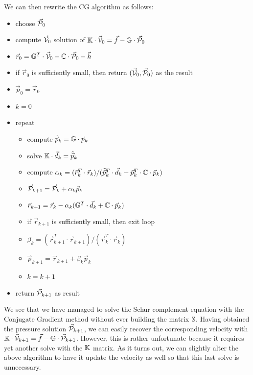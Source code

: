 We can then rewrite the CG algorithm as follows: 
\begin{itemize}
\item choose $\vec{\cal P}_0$
\item compute $\vec{\cal V}_0$ solution of ${\mathbb{K}}\cdot \vec{\cal V}_0 =\vec{f}- {\mathbb{G}}\cdot \vec{\cal P}_0$ 
\item $\vec{r}_0 = {\mathbb{G}}^T\cdot \vec{\cal V}_0 - {\mathbb{C}} \cdot \vec{\cal P}_0 - \vec{h}$ 
\item if $\vec{r}_0$ is sufficiently small, then return $(\vec{\cal V}_0,\vec{\cal P}_0)$ as the result
\item $\vec{p}_0=\vec{r}_0$
\item $k=0$
\item repeat
\begin{itemize}
\item compute $\tilde{\vec{p}}_k = {\mathbb{G}}\cdot \vec{p}_k$
\item solve ${\mathbb{K}}\cdot  \vec{d}_k = \tilde{\vec{p}}_k$
\item compute $\alpha_k=(\vec{r}_k^T \cdot  \vec{r}_k)/
              (\tilde{\vec{p}}_k^T\cdot \vec{d}_k + \vec{p}_k^T\cdot {\mathbb{C}}\cdot\vec{p}_k)$
\item $\vec{\cal P}_{k+1} = \vec{\cal P}_k+\alpha_k \vec{p}_k$
\item $\vec{r}_{k+1} = \vec{r}_k - \alpha_k ({\mathbb{G}}^T \cdot \vec{d}_k + {\mathbb{C}} \cdot \vec{p}_k) $
\item if $\vec{r}_{k+1}$ is sufficiently small, then exit loop
\item $\beta_k=(\vec{r}_{k+1}^T \cdot \vec{r}_{k+1})/(\vec{r}_k^T \cdot \vec{r}_k)$
\item $\vec{p}_{k+1} =\vec{r}_{k+1}+ \beta_k \vec{p}_k$
\item $k=k+1$
\end{itemize}
\item return $\vec{\cal P}_{k+1}$ as result
\end{itemize}
We see that we have managed to solve the Schur complement equation with the Conjugate Gradient method
without ever building the matrix ${\mathbb{S}}$. Having obtained the pressure solution $\vec{\cal P}_{k+1}$, 
we can easily recover 
the corresponding velocity with ${\mathbb{K}}\cdot \vec{\cal V}_{k+1} =\vec{f}- {\mathbb{G}}\cdot \vec{\cal P}_{k+1}$. 
However, this is rather unfortunate because it requires yet another solve with the ${\mathbb{K}}$ matrix. 
As it turns out, we can slightly alter the above algorithm to have it update the velocity 
as well so that this last solve is unnecessary.

